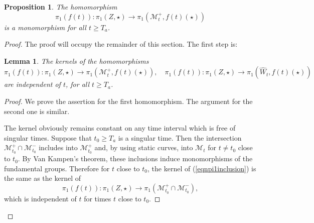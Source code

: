 \documentclass[12pt]{amsart}
\newcommand{\M}{{\mathcal M}}
\newcommand{\ra}{\rightarrow}
\numberwithin{equation}{section}
\theoremstyle{plain}
\newtheorem{lemma}[equation]{Lemma}
\newtheorem{proposition}[equation]{Proposition}
\theoremstyle{definition}
\theoremstyle{remark}
\begin{document}
\begin{proposition}
\label{propincompressible}
The homomorphism 
\begin{equation} \label{injeqn}
\pi_1(f(t)):\pi_1(Z,\star)\ra \pi_1(\M_t^+,f(t)(\star))
\end{equation}
is a monomorphism for all $t\geq T_a$.
\end{proposition}
\begin{proof}
The proof will occupy the remainder of this section.
The first step is:
\begin{lemma} \label{stablelemma}
The kernels of the homomorphisms
\begin{equation}
\label{eqnpi1inclusion}
\pi_1(f(t)):\pi_1(Z,\star)\ra \pi_1(\M_t^+,f(t)(\star)),\quad 
\pi_1(f(t)):\pi_1(Z,\star)\ra \pi_1(\hat W_t,f(t)(\star))
\end{equation}
are independent of $t$, for all $t\geq T_a$.
\end{lemma}
\begin{proof}
We prove the assertion for the first homomorphism. The argument for the 
second one is similar.

The kernel obviously remains constant on any time interval which is free of
singular times. Suppose that $t_0\geq T_a$ is a singular time.  Then the intersection
$
\M_{t_0}^+\cap\M_{t_0}^-
$
includes into $\M_{t_0}^+$ and, by using static curves, into $\M_t$ for $t \neq t_0$
close to $t_0$.  By Van Kampen's theorem, these inclusions induce monomorphisms of the
fundamental groups.  Therefore for $t$ close to $t_0$, 
the kernel of (\ref{eqnpi1inclusion}) is the same as the kernel of 
\begin{equation}
\pi_1(f(t)):\pi_1(Z,\star)\ra \pi_1(\M_{t_0}^+\cap\M_{t_0}^-),
\end{equation}
which is independent of $t$ for times $t$ close to $t_0$.  
\end{proof}


\end{proof}
\end{document}
